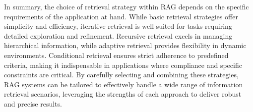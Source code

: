 In summary, the choice of retrieval strategy within RAG depends on the specific requirements of the application at hand. While basic retrieval strategies offer simplicity and efficiency, iterative retrieval is well-suited for tasks requiring detailed exploration and refinement. Recursive retrieval excels in managing hierarchical information, while adaptive retrieval provides flexibility in dynamic environments. Conditional retrieval ensures strict adherence to predefined criteria, making it indispensable in applications where compliance and specific constraints are critical. By carefully selecting and combining these strategies, RAG systems can be tailored to effectively handle a wide range of information retrieval scenarios, leveraging the strengths of each approach to deliver robust and precise results.





